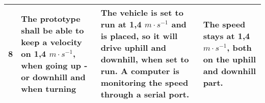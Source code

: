 \begin{table}[H]
\begin{tabular}{|p{1cm}|p{4cm}|p{7cm}|p{3cm}|}
\hline%
           8    &   The prototype shall be able to keep a velocity on 1,4 $m \cdot s^{-1}$, when going up - or downhill and when turning   &  The vehicle is set to run at 1,4 $m \cdot s^{-1}$ and is placed, so it will drive uphill and downhill, when set to run. A computer is monitoring the speed through a serial port.   &    The speed stays at 1,4 $m \cdot s^{-1}$, both on the uphill and downhill part.            \\
\hline%
\end{tabular}
\label{tab:AcceptTestTestProcedure}
\end{table}

